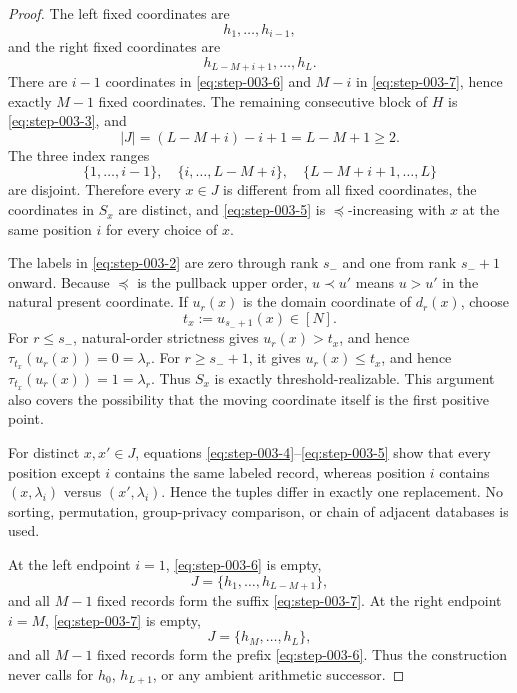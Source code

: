 \begin{proof}

The left fixed coordinates are
\[
h_1,\ldots,h_{i-1},
\tag{6}\label{eq:step-003-6}
\]
and the right fixed coordinates are
\[
h_{L-M+i+1},\ldots,h_L.
\tag{7}\label{eq:step-003-7}
\]
There are \(i-1\) coordinates in \eqref{eq:step-003-6} and \(M-i\) in \eqref{eq:step-003-7}, hence exactly \(M-1\) fixed coordinates. The remaining consecutive block of \(H\) is \eqref{eq:step-003-3}, and
\[
|J|=(L-M+i)-i+1=L-M+1\ge2.
\tag{8}\label{eq:step-003-8}
\]
The three index ranges
\[
\{1,\ldots,i-1\},
\quad
\{i,\ldots,L-M+i\},
\quad
\{L-M+i+1,\ldots,L\}
\tag{9}\label{eq:step-003-9}
\]
are disjoint. Therefore every \(x \in J\) is different from all fixed coordinates, the coordinates in \(S_x\) are distinct, and \eqref{eq:step-003-5} is \(\preceq\)-increasing with \(x\) at the same position \(i\) for every choice of \(x\).

The labels in \eqref{eq:step-003-2} are zero through rank \(s_-\) and one from rank \(s_-+1\) onward. Because \(\preceq\) is the pullback upper order, \(u \prec u'\) means \(u>u'\) in the natural present coordinate. If \(u_r(x)\) is the domain coordinate of \(d_r(x)\), choose
\[
t_x:=u_{s_-+1}(x)\in[N].
\tag{10}\label{eq:step-003-10}
\]
For \(r\le s_-\), natural-order strictness gives \(u_r(x)>t_x\), and hence
\(
\tau_{t_x}(u_r(x))=0=\lambda_r.
\)
For \(r\ge s_-+1\), it gives \(u_r(x)\le t_x\), and hence
\(
\tau_{t_x}(u_r(x))=1=\lambda_r.
\)
Thus \(S_x\) is exactly threshold-realizable. This argument also covers the possibility that the moving coordinate itself is the first positive point.

For distinct \(x,x' \in J\), equations \eqref{eq:step-003-4}--\eqref{eq:step-003-5} show that every position except \(i\) contains the same labeled record, whereas position \(i\) contains \((x,\lambda_i)\) versus \((x',\lambda_i)\). Hence the tuples differ in exactly one replacement. No sorting, permutation, group-privacy comparison, or chain of adjacent databases is used.

At the left endpoint \(i=1\), \eqref{eq:step-003-6} is empty,
\[
J=\{h_1,\ldots,h_{L-M+1}\},
\tag{11}\label{eq:step-003-11}
\]
and all \(M-1\) fixed records form the suffix \eqref{eq:step-003-7}. At the right endpoint \(i=M\), \eqref{eq:step-003-7} is empty,
\[
J=\{h_M,\ldots,h_L\},
\tag{12}\label{eq:step-003-12}
\]
and all \(M-1\) fixed records form the prefix \eqref{eq:step-003-6}. Thus the construction never calls for \(h_0\), \(h_{L+1}\), or any ambient arithmetic successor.

\end{proof}



